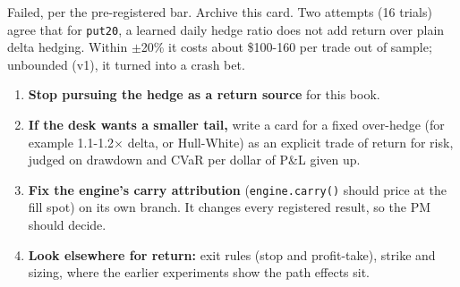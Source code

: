 \documentclass{article}
\begin{document}
Failed, per the pre-registered bar. Archive this card. Two attempts (16 trials) agree that for \texttt{put20}, a learned daily hedge ratio does not add return over plain delta hedging. Within \ensuremath{\pm}20\% it costs about \$100-160 per trade out of sample; unbounded (v1), it turned into a crash bet.

\begin{enumerate}

\item \textbf{Stop pursuing the hedge as a return source} for this book.

\item \textbf{If the desk wants a smaller tail,} write a card for a fixed over-hedge (for example 1.1-1.2\ensuremath{\times} delta, or Hull-White) as an explicit trade of return for risk, judged on drawdown and CVaR per dollar of P\&L given up.

\item \textbf{Fix the engine's carry attribution} (\texttt{engine.\allowbreak{}carry()} should price at the fill spot) on its own branch. It changes every registered result, so the PM should decide.

\item \textbf{Look elsewhere for return:} exit rules (stop and profit-take), strike and sizing, where the earlier experiments show the path effects sit.

\end{enumerate}
\end{document}
